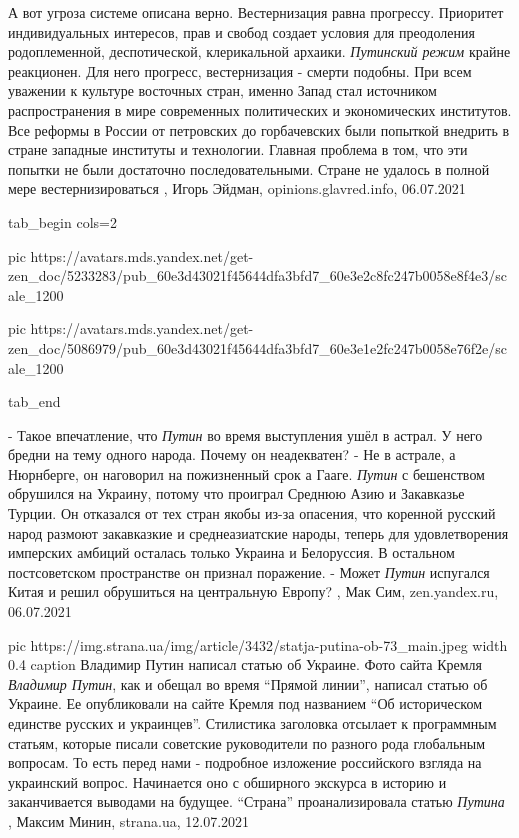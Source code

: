 А вот угроза системе описана верно. Вестернизация равна прогрессу. Приоритет
индивидуальных интересов, прав и свобод создает условия для преодоления
родоплеменной, деспотической, клерикальной архаики. \emph{Путинский режим} крайне
реакционен. Для него прогресс, вестернизация - смерти подобны.
При всем уважении к культуре восточных стран, именно Запад стал источником
распространения в мире современных политических и экономических институтов. Все
реформы в России от петровских до горбачевских были попыткой внедрить в стране
западные институты и технологии. Главная проблема в том, что эти попытки не
были достаточно последовательными. Стране не удалось в полной мере
вестернизироваться
, 
Игорь Эйдман, opinions.glavred.info, 06.07.2021


\ifcmt
  tab_begin cols=2

     pic https://avatars.mds.yandex.net/get-zen_doc/5233283/pub_60e3d43021f45644dfa3bfd7_60e3e2c8fc247b0058e8f4e3/scale_1200

     pic https://avatars.mds.yandex.net/get-zen_doc/5086979/pub_60e3d43021f45644dfa3bfd7_60e3e1e2fc247b0058e76f2e/scale_1200

  tab_end
\fi

- Такое впечатление, что \emph{Путин} во время выступления ушёл в астрал. У
него бредни на тему одного народа. Почему он неадекватен?  - Не в астрале, а
Нюрнберге, он наговорил на пожизненный срок а Гааге. \emph{Путин} с бешенством
обрушился на Украину, потому что проиграл Среднюю Азию и Закавказье Турции. Он
отказался от тех стран якобы из-за опасения, что коренной русский народ
размоют закавказкие и среднеазиатские народы, теперь для удовлетворения
имперских амбиций осталась только Украина и Белоруссия. В остальном
постсоветском пространстве он признал поражение.
- Может \emph{Путин} испугался Китая и решил обрушиться на центральную Европу?
, 
Мак Сим, zen.yandex.ru, 06.07.2021

\ifcmt
  pic https://img.strana.ua/img/article/3432/statja-putina-ob-73_main.jpeg
	width 0.4
	caption Владимир Путин написал статью об Украине. Фото сайта Кремля 
\fi
\emph{Владимир Путин}, как и обещал во время \enquote{Прямой линии}, написал статью об
Украине. Ее опубликовали на сайте Кремля под названием \enquote{Об историческом
единстве русских и украинцев}.  Стилистика заголовка отсылает к программным
статьям, которые писали советские руководители по разного рода глобальным
вопросам. То есть перед нами - подробное изложение российского взгляда на
украинский вопрос.  Начинается оно с обширного экскурса в историю и
заканчивается выводами на будущее.  \enquote{Страна} проанализировала статью \emph{Путина}
, 
Максим Минин, strana.ua, 12.07.2021

